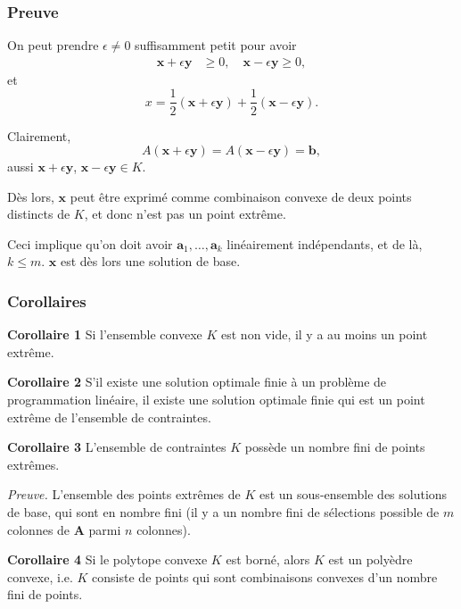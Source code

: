 \documentclass[usepdftitle=false]{beamer}
\def\ba{\boldsymbol{a}}
\def\bb{\boldsymbol{b}}
\def\bx{\boldsymbol{x}}
\def\by{\boldsymbol{y}}
\def\bA{\boldsymbol{A}}
\begin{document}
\begin{frame}
\frametitle{Preuve}

On peut prendre $\epsilon \ne 0$ suffisamment petit pour avoir
\begin{align*}
\bx + \epsilon \by &\geq 0, \quad
\bx - \epsilon \by \geq 0,
\end{align*}
et
\[
  x = \frac{1}{2}(\bx + \epsilon \by) + \frac{1}{2}(\bx - \epsilon \by).
\]

\mbox{}

Clairement,
\[
A(\bx + \epsilon \by) = A(\bx - \epsilon \by) = \bb,
\]
aussi $\bx + \epsilon \by$, $\bx - \epsilon \by \in K$.

\mbox{}

Dès lors, $\bx$ peut être exprimé comme combinaison convexe de deux points distincts de $K$, et donc n'est pas un point extrême.

\mbox{}

Ceci implique qu'on doit avoir $\ba_1,\ldots,\ba_k$ linéairement indépendants, et de là, $k \leq m$. $\bx$ est dès lors une solution de base.
\end{frame}

\begin{frame}
\frametitle{Corollaires}

{\bf Corollaire 1} Si l'ensemble convexe $K$ est non vide, il y a au moins un point extrême.

\mbox{}

{\bf Corollaire 2} S'il existe une solution optimale finie à un problème de programmation linéaire, il existe une solution optimale finie qui est un point extrême de l'ensemble de contraintes.

\mbox{}

{\bf Corollaire 3} L'ensemble de contraintes $K$ possède un nombre fini de points extrêmes.

{\it Preuve.} L'ensemble des points extrêmes de $K$ est un sous-ensemble des solutions de base, qui sont en nombre fini (il y a un nombre fini de sélections possible de $m$ colonnes de $\bA$ parmi $n$ colonnes).

\mbox{}

{\bf Corollaire 4} 
Si le polytope convexe $K$ est borné, alors $K$ est un polyèdre convexe, i.e. $K$ consiste de points qui sont combinaisons convexes d'un nombre fini de points.
\end{frame}
\end{document}
